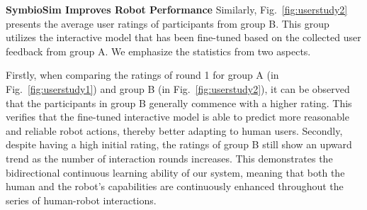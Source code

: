 



\textbf{SymbioSim Improves Robot Performance}
Similarly, Fig.~\ref{fig:userstudy2} presents the average user ratings of participants from group B. This group utilizes the interactive model that has been fine-tuned based on the collected user feedback from group A. We emphasize the statistics from two aspects.

Firstly, when comparing the ratings of round 1 for group A (in Fig.~\ref{fig:userstudy1}) and group B (in Fig.~\ref{fig:userstudy2}), it can be observed that the participants in group B generally commence with a higher rating. This verifies that the fine-tuned interactive model is able to predict more reasonable and reliable robot actions, thereby better adapting to human users.
Secondly, despite having a high initial rating, the ratings of group B still show an upward trend as the number of interaction rounds increases. This demonstrates the bidirectional continuous learning ability of our system, meaning that both the human and the robot's capabilities are continuously enhanced throughout the series of human-robot interactions.



